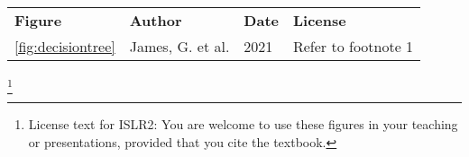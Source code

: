 
\begin{tabularx}{\linewidth}{l|l|l|X} \hline
{\bf Figure} & {\bf Author} & {\bf Date} & {\bf License} \\ 
\ref{fig:decisiontree} & James, G. et al. & 2021 & Refer to footnote 1\\ 
\hline
\end{tabularx}


\footnote{License text for ISLR2: You are welcome to use these figures in your teaching or presentations, provided that you cite the textbook. }



